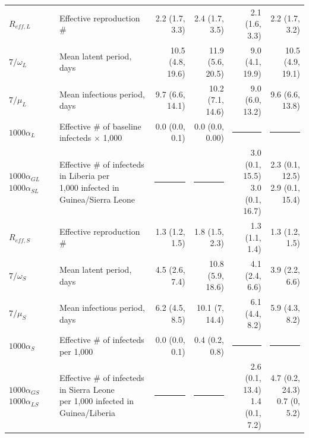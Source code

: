 \begin{table}
\begin{tabular}{llrrrr}
		\hline
		$ R_{eff,L} $& Effective reproduction \#& 2.2 (1.7, 3.3) & 2.4 (1.7, 3.5) & 2.1 (1.6, 3.3) & 2.2 (1.7, 3.2) \\ 
		$ 7/\omega_L $& Mean latent period, days& 10.5 (4.8, 19.6) & 11.9 (5.6, 20.5) & 9.0 (4.1, 19.9) & 10.5 (4.9, 19.1) \\ 
		$ 7/\mu_L $& Mean infectious period, days& 9.7 (6.6, 14.1) & 10.2 (7.1, 14.6) & 9.0 (6.0, 13.2) & 9.6 (6.6, 13.8) \\ 
		$ 1000\alpha_L $& Effective \# of baseline infecteds $ \times $ 1,000 & 0.0 (0.0, 0.1) & 0.0 (0.0, 0.00) &\rule[0.5ex]{0.75in}{0.5pt} &\rule[0.5ex]{0.75in}{0.5pt} \\ 
		\makecell[l]{$ 1000\alpha_{GL} $\\ $ 1000\alpha_{SL} $} & \makecell[l]{Effective \# of infecteds in Liberia per \\ \hspace{0.05in} 1,000 infected in Guinea/Sierra Leone} & \rule[0.5ex]{0.75in}{0.5pt} & \rule[0.5ex]{0.75in}{0.5pt} & \makecell[r]{3.0 (0.1, 15.5) \\ 3.0 (0.1, 16.7)} & \makecell[r]{2.3 (0.1, 12.5) \\ 2.9 (0.1, 15.4)}\\
		\hline
		$ R_{eff,S} $& Effective reproduction \#& 1.3 (1.2, 1.5) & 1.8 (1.5, 2.3) & 1.3 (1.1, 1.4) & 1.3 (1.2, 1.5) \\ 
		$ 7/\omega_S $& Mean latent period, days& 4.5 (2.6, 7.4) & 10.8 (5.9, 18.6) & 4.1 (2.4, 6.6) & 3.9 (2.2, 6.6) \\ 
		$ 7/\mu_S $& Mean infectious period, days & 6.2 (4.5, 8.5) & 10.1 (7, 14.4) & 6.1 (4.4, 8.2) & 5.9 (4.3, 8.2) \\ 
		$ 1000\alpha_S $& Effective \# of infecteds per 1,000 & 0.0 (0.0, 0.1) & 0.4 (0.2, 0.8) &  \rule[0.5ex]{0.75in}{0.5pt}&  \rule[0.5ex]{0.75in}{0.5pt} \\ 
		\makecell[l]{$ 1000\alpha_{GS} $\\ $ 1000\alpha_{LS} $} & \makecell[l]{Effective \# of infecteds in Sierra Leone\\ \hspace{0.05in} per 1,000 infected in Guinea/Liberia} & \rule[0.5ex]{0.75in}{0.5pt} & \rule[0.5ex]{0.75in}{0.5pt} & \makecell[r]{2.6 (0.1, 13.4) \\ 1.4 (0.1, 7.2)} & \makecell[r]{4.7 (0.2, 24.3) \\ 0.7 (0, 5.2)} \\
		\hline
	\end{tabular}
\end{table}

